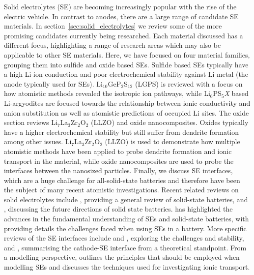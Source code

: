 \documentclass[../main.tex]{subfiles}
\begin{document}
Solid electrolytes (SE) are becoming increasingly popular with the rise of the electric vehicle. In contrast to anodes, there are a large range of candidate SE materials. In section~\ref{sec:solid_electrolytes} we review some of the more promising candidates currently being researched. Each material discussed has a different focus, highlighting a range of research areas which may also be applicable to other SE materials. Here, we have focused on four material families, grouping them into sulfide and oxide based SEs. Sulfide based SEs typically have a high Li-ion conduction and poor electrochemical stability against Li metal (the anode typically used for SEs). \cite{Zhu2015, Zhang2019se_rev} Li$_{10}$GeP$_2$S$_{12}$ (LGPS) is reviewed with a focus on how atomistic methods revealed the isotropic ion pathways, while Li$_6$PS$_5$\textit{X} based Li-argyodites are focused towards the relationship between ionic conductivity and anion substitution as well as atomistic predictions of occupied Li sites. The oxide section reviews Li$_7$La$_3$Zr$_2$O$_2$ (LLZO) and oxide nanocomposites. Oxides typically have a higher electrochemical stability but still suffer from dendrite formation among other issues.\cite{Zhu2015} Li$_7$La$_3$Zr$_2$O$_2$ (LLZO) is used to demonstrate how multiple atomistic methods have been applied to probe dendrite formation and ionic transport in the material, while oxide nanocomposites are used to probe the interfaces between the nanosized particles. Finally, we discuss SE interfaces, which are a huge challenge for all-solid-state batteries and therefore have been the subject of many recent atomistic investigations. Recent related reviews on solid electrolytes include \citeauthor{Sun2017se_review} \cite{Sun2017se_review}, providing a general review of solid-state batteries, and \citeauthor{Zhang2018se_review}, \cite{Zhang2018se_review} discussing the future directions of solid state batteries. \citeauthor{famprikis_fundamentals_2019} \cite{famprikis_fundamentals_2019} has highlighted the advances in the fundamental understanding of SEs and solid-state batteries, with \citeauthor{Gurung2019} \cite{Gurung2019} providing details the challenges faced when using SEs in a battery. More specific reviews of the SE interfaces include \citeauthor{Xu2018exp} \cite{Xu2018exp} and \citeauthor{Xiao2020interfacerev} \cite{Xiao2020interfacerev}, exploring the challenges and stability, and \citeauthor{Tateyama2019} \cite{Tateyama2019}, summarising the cathode-SE interface from a theoretical standpoint. From a modelling perspective, \citeauthor{Ceder2018} \cite{Ceder2018} outlines the principles that should be employed when modelling SEs and \citeauthor{Gao2020_ion_transport} \cite{Gao2020_ion_transport} discusses the techniques used for investigating ionic transport.
\end{document}
